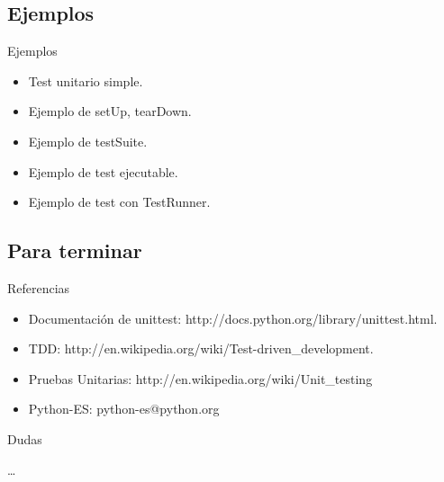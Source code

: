 \documentclass[10pt]{beamer}
\begin{document}
  \subsection*{Ejemplos}
  \begin{frame}{Ejemplos}
    \begin{itemize}
      \item Test unitario simple.
      \item Ejemplo de setUp, tearDown.
      \item Ejemplo de testSuite.
      \item Ejemplo de test ejecutable.
      \item Ejemplo de test con TestRunner.
    \end{itemize}
  \end{frame}
  
  \subsection*{Para terminar}
  \begin{frame}{Referencias}
    \begin{itemize}
      \item Documentación de unittest: http://docs.python.org/library/unittest.html.
      \item TDD: http://en.wikipedia.org/wiki/Test-driven\_development.
      \item Pruebas Unitarias: http://en.wikipedia.org/wiki/Unit\_testing
      \item Python-ES: python-es@python.org
    \end{itemize}
  \end{frame}

  \begin{frame}{Dudas}
    \begin{center}
      \dots
    \end{center}
  \end{frame}
\end{document}
